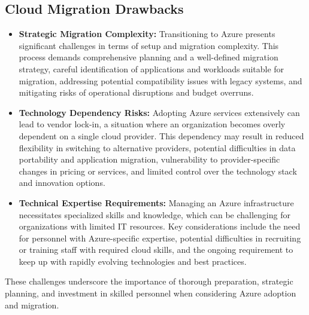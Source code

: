\documentclass{llncs}
\begin{document}
\subsection{Cloud Migration Drawbacks}
\begin{itemize}

\item \textbf{Strategic Migration Complexity: }Transitioning to Azure presents significant challenges in terms of setup and migration complexity. This process demands comprehensive planning and a well-defined migration strategy, careful identification of applications and workloads suitable for migration, addressing potential compatibility issues with legacy systems, and mitigating risks of operational disruptions and budget overruns.

\item \textbf{Technology Dependency Risks: }
Adopting Azure services extensively can lead to vendor lock-in, a situation where an organization becomes overly dependent on a single cloud provider. This dependency may result in reduced flexibility in switching to alternative providers, potential difficulties in data portability and application migration, vulnerability to provider-specific changes in pricing or services, and limited control over the technology stack and innovation options.

\item \textbf{Technical Expertise Requirements: }
Managing an Azure infrastructure necessitates specialized skills and knowledge, which can be challenging for organizations with limited IT resources. Key considerations include the need for personnel with Azure-specific expertise, potential difficulties in recruiting or training staff with required cloud skills, and the ongoing requirement to keep up with rapidly evolving technologies and best practices.
\end{itemize}
These challenges underscore the importance of thorough preparation, strategic planning, and investment in skilled personnel when considering Azure adoption and migration.
\end{document}
